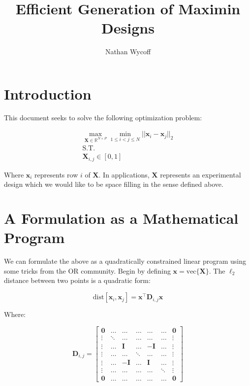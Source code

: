 \documentclass[]{article}
\title{Efficient Generation of Maximin Designs}
\author{Nathan Wycoff}
\begin{document}
\maketitle

\section{Introduction}

This document seeks to solve the following optimization problem:

\begin{align*}
	\max_{\mathbf{X} \in \mathbb{R}^{N\times P}} \min_{1 \leq i < j \leq N} ||\mathbf{x}_i - \mathbf{x}_j||_2 \\ 
	\textrm{S.T.}\\
	\mathbf{X}_{i,j} \in [0,1]
\end{align*}

Where $\mathbf{x}_i$ represents row $i$ of $\mathbf{X}$. In applications, $\mathbf{X}$ represents an experimental design which we would like to be space filling in the sense defined above.

\section{A Formulation as a Mathematical Program}

We can formulate the above as a quadratically constrained linear program using some tricks from the OR community. Begin by defining $\mathbf{x} = \textrm{vec}\{\mathbf{X}\}$. The $\ell_2$ distance between two points is a quadratic form:

\begin{equation}
	\textrm{dist}[\mathbf{x}_i, \mathbf{x}_j] = \mathbf{x}^\top\mathbf{D}_{i,j}\mathbf{x}
\end{equation}

Where:

\begin{equation}
	\mathbf{D}_{i,j} = \left[\begin{array}{ccccccc}
		\mathbf{0} & \ldots & \ldots & \ldots & \ldots & \ldots &\mathbf{0} \\
		\vdots & \ddots & \ldots & \ldots & \ldots & \ldots & \vdots \\
		\vdots & \ldots & \mathbf{I} & \ldots & -\mathbf{I}  & \ldots & \vdots \\
		\vdots & \ldots & \ldots & \ddots & \ldots & \ldots & \vdots \\
		\vdots & \ldots & -\mathbf{I}  & \ldots & \mathbf{I} & \ldots & \vdots \\
		\vdots & \ldots & \ldots & \ldots & \ldots & \ddots & \vdots \\
		\mathbf{0} & \ldots & \ldots & \ldots & \ldots & \ldots & \mathbf{0} 
	\end{array}	\right]
\end{equation}
\end{document}
